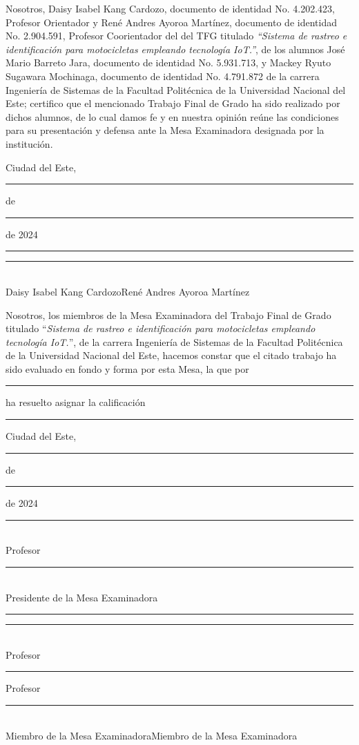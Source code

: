 \newpage \normalsize
Nosotros, Daisy Isabel Kang Cardozo, documento de identidad No. 4.202.423, Profesor Orientador y René Andres Ayoroa Martínez, documento de identidad No. 2.904.591, Profesor Coorientador del  del TFG titulado \textit{``Sistema de rastreo e identificación para motocicletas empleando tecnología IoT.''}, de los alumnos José Mario Barreto Jara, documento de identidad No. 5.931.713, y Mackey Ryuto Sugawara Mochinaga, documento de identidad No. 4.791.872 de la carrera Ingeniería de Sistemas de la Facultad Politécnica de la Universidad Nacional del Este; certifico que el mencionado Trabajo Final de Grado ha sido realizado por dichos alumnos,  de lo cual damos fe y en nuestra opinión reúne
las condiciones para su presentación y defensa ante la Mesa Examinadora designada por la institución.

\begin{flushright}Ciudad del Este, \rule{1cm}{0.4pt} de \rule{2cm}{0.4pt} de 2024 \end{flushright}
\vspace{0.7cm}
	

\hspace*{-0.4cm}\rule{6cm}{0.4pt}\hspace{1.15cm}\rule{6cm}{0.4pt}\\
		
Daisy Isabel Kang Cardozo\hspace{1.9cm}René Andres Ayoroa Martínez


		
\vspace{1.6cm}
Nosotros, los miembros de la Mesa Examinadora del Trabajo Final de Grado titulado ``\textit{Sistema de rastreo e identificación para motocicletas empleando tecnología IoT.}'', de la carrera Ingeniería de Sistemas de la Facultad Politécnica de la Universidad Nacional del Este, hacemos constar que el citado trabajo ha sido evaluado en fondo y forma por esta Mesa, la que por \rule{4cm}{0.4pt} ha resuelto asignar la calificación \rule{2cm}{0.4pt}

\begin{flushright}Ciudad del Este, \rule{1cm}{0.4pt} de \rule{2cm}{0.4pt} de 2024 \end{flushright}

\vspace{.5cm}
\hspace{2.2cm}\rule{7cm}{0.4pt}\\
\hspace*{3cm} Profesor \rule{4.5cm}{0.4pt}\\
\hspace*{2.8cm} Presidente de la Mesa Examinadora
\vspace{.7cm}

\hspace*{-0.4cm}\rule{6cm}{0.4pt}\hspace{1.15cm}\rule{6cm}{0.4pt}\\
\vspace{.3cm}
Profesor \rule{4.5cm}{0.4pt}		\hspace{.9cm}Profesor \rule{4.5cm}{0.4pt}\\
Miembro de la Mesa Examinadora\hspace{1cm}Miembro de la Mesa Examinadora